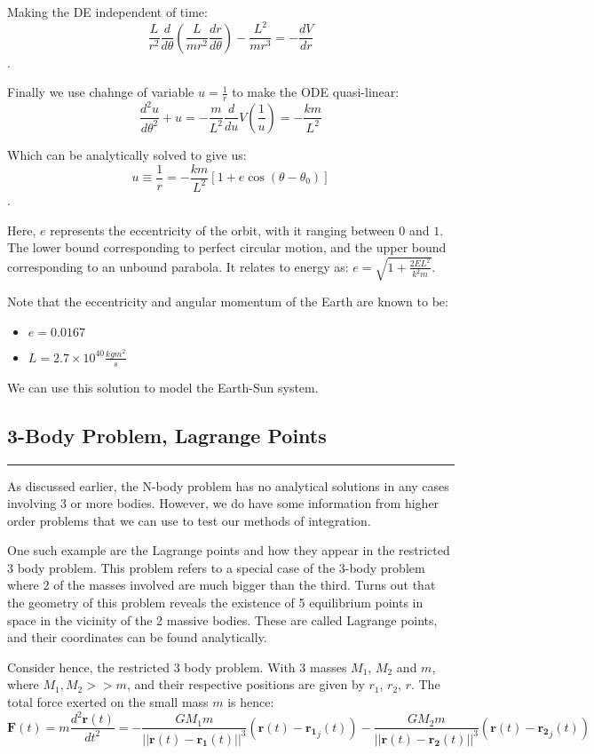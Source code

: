 \documentclass[hidelinks, 11pt, dvipsnames]{article}
\newcommand{\psubsection}[1]{{
    \begin{center}
        \section*{\Large #1}
        \noindent \rule{17cm}{0.2pt}
    \end{center}
}}
\begin{document}
    Making the DE independent of time:
    $$ \frac{L}{r^2} \frac{d}{d\theta} \left( \frac{L}{mr^2} \frac{dr}{d\theta} \right)- \frac{L^2}{mr^3} = -\frac{dV}{dr} $$.

    Finally we use chahnge of variable $u = \frac{1}{r}$ to make the ODE quasi-linear:
    $$ \frac{d^2 u}{d\theta^2} + u = -\frac{m}{L^2}  \frac{d}{du} V\left( \frac 1 u\right) = -\frac{km}{L^2} $$

    Which can be analytically solved to give us:
    $$u \equiv \frac{1}{r} = -\frac{km}{L^2} \left[ 1 + e \cos(\theta - \theta_0) \right]
    $$.

    Here, $e$ represents the eccentricity of the orbit, with it ranging between $0$ and $1$. The lower bound corresponding to perfect circular motion, and the upper bound corresponding to an unbound parabola. It relates to energy as:
    $e = \sqrt{1 + \frac{2EL^2}{k^2 m}}$.

    Note that the eccentricity and angular momentum of the Earth are known to be:
    \begin{itemize}
        \item $e = 0.0167$
        \item $L =  2.7\times10^{40} \frac{kg m^2}{s}$
    \end{itemize}

    We can use this solution to model the Earth-Sun system.

    \psubsection{3-Body Problem, Lagrange Points}
    As discussed earlier, the N-body problem has no analytical solutions in any cases involving 3 or more bodies. However, we do have some information from higher order problems that we can use to test our methods of integration.

    One such example are the Lagrange points and how they appear in the restricted 3 body problem. This problem refers to a special case of the 3-body problem where 2 of the masses involved are much bigger than the third. Turns out that the geometry of this problem reveals the existence of 5 equilibrium points in space in the vicinity of the 2 massive bodies. These are called Lagrange points, and their coordinates can be found analytically.

    Consider hence, the restricted 3 body problem. With 3 masses $M_1$, $M_2$ and $m$, where $M_1, M_2 >> m$, and their respective positions are given by $r_1$, $r_2$, $r$. The total force exerted on the small mass $m$ is hence:
    $$ \mathbf{F}(t) = m\frac{d^2 \mathbf{r}(t)}{dt^2} = -\frac{G M_1 m}{|| \mathbf{r}(t) - \mathbf{r_1}(t) ||^3}(\mathbf{r}(t) - \mathbf{r_1}_j(t))-\frac{G M_2 m}{|| \mathbf{r}(t) - \mathbf{r_2}(t) ||^3}(\mathbf{r}(t) - \mathbf{r_2}_j(t)) $$
\end{document}
